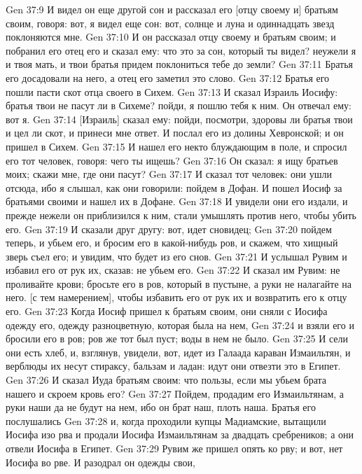 \vs Gen 37:9 И видел он еще другой сон и рассказал его [отцу своему и] братьям своим, говоря: вот, я видел еще сон: вот, солнце и луна и одиннадцать звезд поклоняются мне.
\vs Gen 37:10 И он рассказал отцу своему и братьям своим; и побранил его отец его и сказал ему: что это за сон, который ты видел? неужели я и твоя мать, и твои братья придем поклониться тебе до земли?
\vs Gen 37:11 Братья его досадовали на него, а отец его заметил это слово.
\rsbpar\vs Gen 37:12 Братья его пошли пасти скот отца своего в Сихем.
\vs Gen 37:13 И сказал Израиль Иосифу: братья твои не пасут ли в Сихеме? пойди, я пошлю тебя к ним. Он отвечал ему: вот я.
\vs Gen 37:14 [Израиль] сказал ему: пойди, посмотри, здоровы ли братья твои и цел ли скот, и принеси мне ответ. И послал его из долины Хевронской; и он пришел в Сихем.
\vs Gen 37:15 И нашел его некто блуждающим в поле, и спросил его тот человек, говоря: чего ты ищешь?
\vs Gen 37:16 Он сказал: я ищу братьев моих; скажи мне, где они пасут?
\vs Gen 37:17 И сказал тот человек: они ушли отсюда, ибо я слышал, как они говорили: пойдем в Дофан. И пошел Иосиф за братьями своими и нашел их в Дофане.
\vs Gen 37:18 И увидели они его издали, и прежде нежели он приблизился к ним, стали умышлять против него, чтобы убить его.
\vs Gen 37:19 И сказали друг другу: вот, идет сновидец;
\vs Gen 37:20 пойдем теперь, и убьем его, и бросим его в какой-нибудь ров, и скажем, что хищный зверь съел его; и увидим, что будет из его снов.
\vs Gen 37:21 И услышал  Рувим и избавил его от рук их, сказав: не убьем его.
\vs Gen 37:22 И сказал им Рувим: не проливайте крови; бросьте его в ров, который в пустыне, а руки не налагайте на него.  [с тем намерением], чтобы избавить его от рук их и возвратить его к отцу его.
\vs Gen 37:23 Когда Иосиф пришел к братьям своим, они сняли с Иосифа одежду его, одежду разноцветную, которая была на нем,
\vs Gen 37:24 и взяли его и бросили его в ров; ров же тот был пуст; воды в нем не было.
\vs Gen 37:25 И сели они есть хлеб, и, взглянув, увидели, вот, идет из Галаада караван Измаильтян, и верблюды их несут стираксу, бальзам и ладан: идут они отвезти это в Египет.
\vs Gen 37:26 И сказал Иуда братьям своим: что пользы, если мы убьем брата нашего и скроем кровь его?
\vs Gen 37:27 Пойдем, продадим его Измаильтянам, а руки наши да не будут на нем, ибо он брат наш, плоть наша. Братья его послушались
\vs Gen 37:28 и, когда проходили купцы Мадиамские, вытащили Иосифа изо рва и продали Иосифа Измаильтянам за двадцать сребреников; а они отвели Иосифа в Египет.
\vs Gen 37:29 Рувим же пришел опять ко рву; и вот, нет Иосифа во рве. И разодрал он одежды свои,
